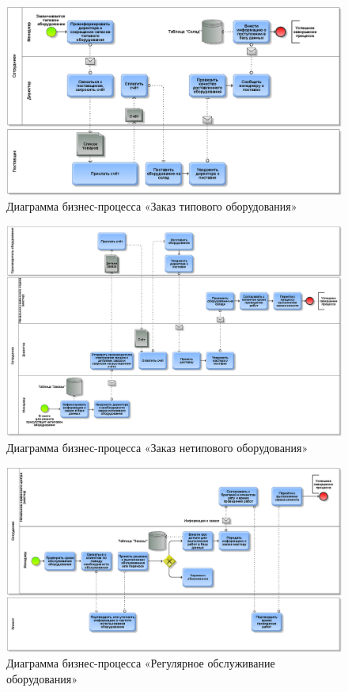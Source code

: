 \documentclass[a4paper,12pt]{article}
\begin{document}
\begin{figure}[h]
    \centering
    \includegraphics[width=\linewidth]{order1.png}
    \caption{Диаграмма бизнес-процесса «Заказ типового оборудования»}
    \label{fig:order1}
\end{figure}
\begin{figure}[h]
    \centering
    \includegraphics[width=\linewidth]{order2.png}
    \caption{Диаграмма бизнес-процесса «Заказ нетипового оборудования»}
    \label{fig:order2}
\end{figure}

\begin{figure}[h]
    \centering
    \includegraphics[width=\linewidth]{service.png}
    \caption{Диаграмма бизнес-процесса «Регулярное обслуживание оборудования»}
    \label{fig:service}
\end{figure}

 
\end{document}
